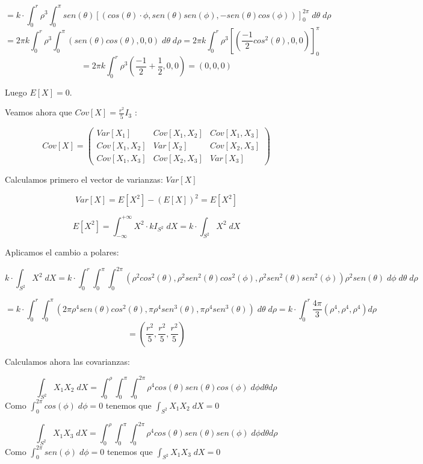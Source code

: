 \documentclass{article}
\theoremstyle{theorem-style}  %
\theoremstyle{definition}
\theoremstyle{example-style}
\begin{document}
\begin{itemize}
		$$= k \cdot \int_{0}^{r} \rho^3 \int_{0}^{\pi} sen(\theta) \left[(cos(\theta)\cdot \phi, sen(\theta)sen(\phi),-sen(\theta)cos(\phi))\right]^{2\pi}_0\;d\theta\;d\rho$$
		$$= 2\pi k \int_{0}^{r} \rho^3 \int_{0}^{\pi} (sen(\theta)cos(\theta),0,0)\;d\theta\;d\rho = 2\pi k \int_{0}^{r} \rho^3 \left[\left(\frac{-1}{2}cos^2(\theta),0,0\right)\right]_0^\pi$$
		$$= 2\pi k \int_{0}^{r} \rho^3 \left(\frac{-1}{2}+\frac{1}{2},0,0\right) = (0,0,0)$$
		
		Luego $E[X] = 0$.
		
		Veamos ahora que $Cov[X] = \displaystyle\frac{r^2}{5}I_3$ :
		
		$$Cov[X] = \left( \begin{array}{ccc}
					Var[X_1] & Cov[X_1,X_2] & Cov[X_1,X_3] \\
					Cov[X_1,X_2] & Var[X_2] & Cov[X_2,X_3] \\
					Cov[X_1,X_3] & Cov[X_2,X_3] & Var[X_3]
				\end{array}\right)$$ 
				
		Calculamos primero el vector de varianzas: $Var[X]$
		
		$$Var[X] = E[X^2]-(E[X])^2 = E[X^2]$$
		
		$$E[X^2] = \int_{-\infty}^{+\infty}X^2\cdot k I_{S^2} \;dX = k \cdot \int_{S^2}X^2\;dX$$
		
		Aplicamos el cambio a polares:
		
		$$k \cdot \int_{S^2}X^2\;dX = k \cdot \int_{0}^{r} \int_{0}^{\pi} \int_{0}^{2\pi} (\rho^2 cos^2(\theta), \rho^2 sen^2(\theta)cos^2(\phi),
		\rho^2 sen^2(\theta)sen^2(\phi)) \rho^2sen(\theta)\;d\phi\;d\theta\;d\rho$$
		
		$$= k \cdot \int_{0}^{r} \int_{0}^{\pi}(2\pi\rho^4 sen(\theta)cos^2(\theta), \pi\rho^4 sen^3(\theta),
		\pi\rho^4 sen^3(\theta))\;d\theta\;d\rho = k \cdot\int_{0}^{r} \frac{4\pi}{3}(\rho^4,\rho^4,\rho^4) d\rho$$
		$$=\left(\frac{r^2}{5},\frac{r^2}{5},\frac{r^2}{5}\right)$$
		
		Calculamos ahora las covarianzas:
		
		$$\int_{S^2}X_1X_2\;dX = \int_{0}^{\rho} \int_{0}^{\pi} \int_{0}^{2\pi}\rho^4cos(\theta)sen(\theta)cos(\phi)\;d\phi d\theta d\rho$$
		Como $\displaystyle\int_{0}^{2\pi}cos(\phi) \;d\phi = 0$ tenemos que $\displaystyle\int_{S^2}X_1X_2\;dX =0$
		
		$$\int_{S^2}X_1X_3\;dX = \int_{0}^{\rho} \int_{0}^{\pi} \int_{0}^{2\pi}\rho^4cos(\theta)sen(\theta)sen(\phi)\;d\phi d\theta d\rho$$
		Como $\displaystyle\int_{0}^{2\pi}sen(\phi) \;d\phi = 0$ tenemos que $\displaystyle\int_{S^2}X_1X_3\;dX =0$
		

\end{itemize}
\end{document}
